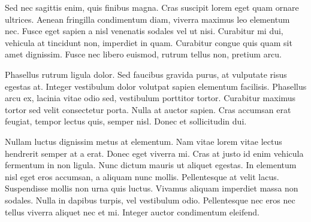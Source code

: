 Sed nec sagittis enim, quis finibus magna. Cras suscipit lorem eget quam ornare ultrices. Aenean fringilla condimentum diam, viverra maximus leo elementum nec. Fusce eget sapien a nisl venenatis sodales vel ut nisi. Curabitur mi dui, vehicula at tincidunt non, imperdiet in quam. Curabitur congue quis quam sit amet dignissim. Fusce nec libero euismod, rutrum tellus non, pretium arcu.

Phasellus rutrum ligula dolor. Sed faucibus gravida purus, at vulputate risus egestas at. Integer vestibulum dolor volutpat sapien elementum facilisis. Phasellus arcu ex, lacinia vitae odio sed, vestibulum porttitor tortor. Curabitur maximus tortor sed velit consectetur porta. Nulla at auctor sapien. Cras accumsan erat feugiat, tempor lectus quis, semper nisl. Donec et sollicitudin dui.

Nullam luctus dignissim metus at elementum. Nam vitae lorem vitae lectus hendrerit semper at a erat. Donec eget viverra mi. Cras at justo id enim vehicula fermentum in non ligula. Nunc dictum mauris ut aliquet egestas. In elementum nisl eget eros accumsan, a aliquam nunc mollis. Pellentesque at velit lacus. Suspendisse mollis non urna quis luctus. Vivamus aliquam imperdiet massa non sodales. Nulla in dapibus turpis, vel vestibulum odio. Pellentesque nec eros nec tellus viverra aliquet nec et mi. Integer auctor condimentum eleifend.




\newpage
\cleardoublepage










